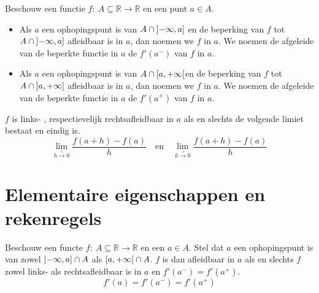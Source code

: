 \documentclass[main.tex]{subfiles}
\begin{document}
\begin{de}
  Beschouw een functie $f:\ A \subseteq \mathbb{R} \rightarrow \mathbb{R}$ en een punt $a \in A$.
  \begin{itemize}
  \item Als $a$ een ophopingspunt is van $A \cap \interval[open left]{-\infty}{a}$ en de beperking van $f$ tot $A \cap \interval[open left]{-\infty}{a}$ afleidbaar is in $a$, dan noemen we $f$  in $a$.
    We noemen de afgeleide van de beperkte functie in $a$ de  $f'(a^{-})$ van $f$ in $a$.
  \item Als $a$ een ophopingspunt is van $A \cap \interval[open right]{a}{+\infty}$en de beperking van $f$ tot $A \cap \interval[open left]{a}{+\infty}$ afleidbaar is in $a$, dan noemen we $f$  in $a$.
    We noemen de afgeleide van de beperkte functie in $a$ de  $f'(a^{+})$ van $f$ in $a$.
  \end{itemize}
\end{de}

\begin{st}
  $f$ is links- , respectievelijk rechtsafleidbaar in $a$ als en slechts de volgende limiet bestaat en eindig is.
  \[ \lim_{h\overset{<}{\rightarrow} 0}\frac{f(a+h)-f(a)}{h} \quad\text{en}\quad \lim_{h\overset{>}{\rightarrow} 0}\frac{f(a+h)-f(a)}{h} \]
\end{st}
 

\section{Elementaire eigenschappen en rekenregels}
\label{sec:elem-eigensch-en}

\begin{pr}
  Beschouw een functe $f:\ A \subseteq \mathbb{R} \rightarrow \mathbb{R}$ en een $a\in A$.
  Stel dat $a$ een ophopingspunt is van zowel $\interval[open left]{-\infty}{a} \cap A$ als $\interval[open right]{a}{+\infty} \cap A$.
  $f$ is dan afleidbaar in $a$ als en slechts $f$ zowel links- als rechtsafleidbaar is in $a$ en $f'(a^{-})=f'(a^{+})$.
  \[ f'(a) = f'(a^{-})=f'(a^{+}) \]
\end{pr}
\end{document}
